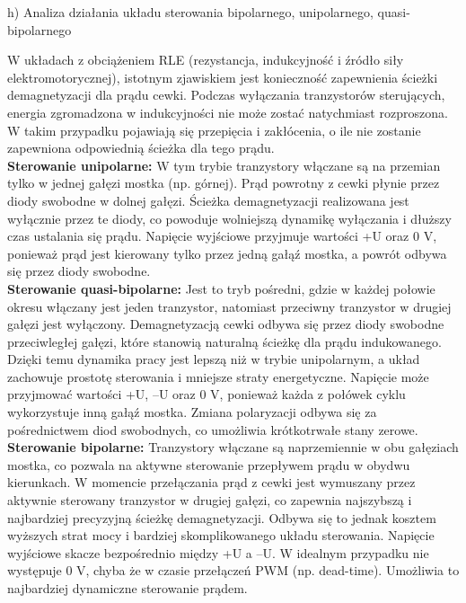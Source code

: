 \documentclass[11pt]{article}
\begin{document}
h) Analiza działania układu sterowania bipolarnego, unipolarnego, quasi-bipolarnego

W układach z obciążeniem RLE (rezystancja, indukcyjność i źródło siły elektromotorycznej), istotnym zjawiskiem jest konieczność zapewnienia ścieżki demagnetyzacji dla prądu cewki. Podczas wyłączania tranzystorów sterujących, energia zgromadzona w indukcyjności nie może zostać natychmiast rozproszona. W takim przypadku pojawiają się przepięcia i zakłócenia, o ile nie zostanie zapewniona odpowiednią ścieżka dla tego prądu.\\

\textbf{Sterowanie unipolarne:}
W tym trybie tranzystory włączane są na przemian tylko w jednej gałęzi mostka (np. górnej). Prąd powrotny z cewki płynie przez diody swobodne w dolnej gałęzi. Ścieżka demagnetyzacji realizowana jest wyłącznie przez te diody, co powoduje wolniejszą dynamikę wyłączania i dłuższy czas ustalania się prądu.
Napięcie wyjściowe przyjmuje wartości +U oraz 0 V, ponieważ prąd jest kierowany tylko przez jedną gałąź mostka, a powrót odbywa się przez diody swobodne.\\

\textbf{Sterowanie quasi-bipolarne:}
Jest to tryb pośredni, gdzie w każdej połowie okresu włączany jest jeden tranzystor, natomiast przeciwny tranzystor w drugiej gałęzi jest wyłączony. Demagnetyzacją cewki odbywa się przez diody swobodne przeciwległej gałęzi, które stanowią naturalną ścieżkę dla prądu indukowanego. Dzięki temu dynamika pracy jest lepszą niż w trybie unipolarnym, a układ zachowuje prostotę sterowania i mniejsze straty energetyczne.
Napięcie może przyjmować wartości +U, –U oraz 0 V, ponieważ każda z połówek cyklu wykorzystuje inną gałąź mostka. Zmiana polaryzacji odbywa się za pośrednictwem diod swobodnych, co umożliwia krótkotrwałe stany zerowe.\\

\textbf{Sterowanie bipolarne:}
Tranzystory włączane są naprzemiennie w obu gałęziach mostka, co pozwala na aktywne sterowanie przepływem prądu w obydwu kierunkach. W momencie przełączania prąd z cewki jest wymuszany przez aktywnie sterowany tranzystor w drugiej gałęzi, co zapewnia najszybszą i najbardziej precyzyjną ścieżkę demagnetyzacji. Odbywa się to jednak kosztem wyższych strat mocy i bardziej skomplikowanego układu sterowania.
Napięcie wyjściowe skacze bezpośrednio między +U a –U. W idealnym przypadku nie występuje 0 V, chyba że w czasie przełączeń PWM (np. dead-time). Umożliwia to najbardziej dynamiczne sterowanie prądem.\\
\end{document}
